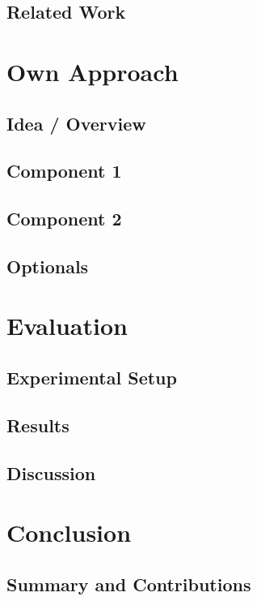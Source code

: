 \documentclass[%
  a4paper,fontsize=11pt,abstract=on,%
  twoside,BCOR=19mm,%
]{scrreprt}
\begin{document}
\section{Related Work}\label{sec:relwork}
\lipsum[1-3]



\chapter{Own Approach}\label{ch:ownApproach}
\lipsum[1]
\section{Idea / Overview}
\lipsum[1-3]
\section{Component 1}
\lipsum[1-3]
\section{Component 2}
\lipsum[1-3]
\section{Optionals}
\lipsum[1-3]



\chapter{Evaluation}\label{ch:eval}
\lipsum[1]
\section{Experimental Setup}
\lipsum[1-3]
\section{Results}
\lipsum[1-3]
\section{Discussion}
\lipsum[1-3]



\chapter{Conclusion}\label{ch:conclusion}
\lipsum[1]
\section{Summary and Contributions}
\lipsum[1-3]
\end{document}

